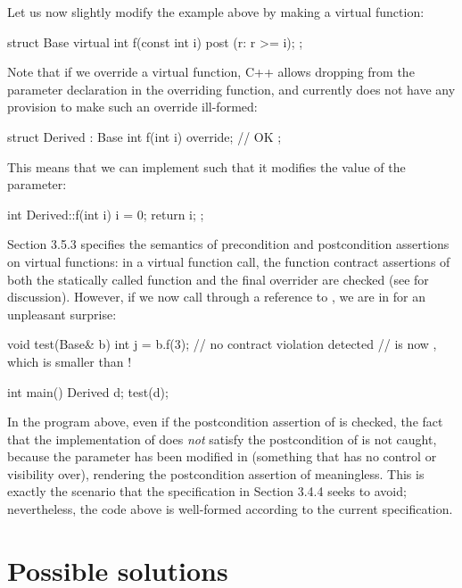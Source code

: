 Let us now slightly modify the example above by making  a virtual function:
\begin{codeblock}
struct Base {
  virtual int f(const int i) post (r: r >= i);
};
\end{codeblock}
Note that if we override a virtual function, C++ allows dropping  from the parameter declaration in the overriding function, and \cite{P2900R10} currently does not have any provision to make such an override ill-formed:
\begin{codeblock}
struct Derived : Base {
  int f(int i) override; // OK
};
\end{codeblock}
This means that we can implement  such that it modifies the value of the parameter:
\begin{codeblock}
int Derived::f(int i) {
  i = 0;
  return i;
};
\end{codeblock}
\cite{P2900R10} Section 3.5.3 specifies the semantics of precondition and postcondition assertions on virtual functions: in a virtual function call, the function contract assertions of both the statically called function  and the final overrider  are checked (see \cite{P3097R0} for discussion). However, if we now call  through a reference to , we are in for an unpleasant surprise:
\begin{codeblock}
void test(Base& b) {
  int j = b.f(3);  // no contract violation detected
  //  is now , which is smaller than !
}

int main() {
  Derived d;
  test(d);
}
\end{codeblock}

In the program above, even if the postcondition assertion of  is checked, the fact that the implementation of  does \emph{not} satisfy the postcondition of  is not caught, because the parameter  has been modified in  (something that  has no control or visibility over), rendering the postcondition assertion of  meaningless. This is exactly the scenario that the specification in \cite{P2900R10} Section 3.4.4 seeks to avoid; nevertheless, the code above is well-formed according to the current specification.

\section{Possible solutions}


